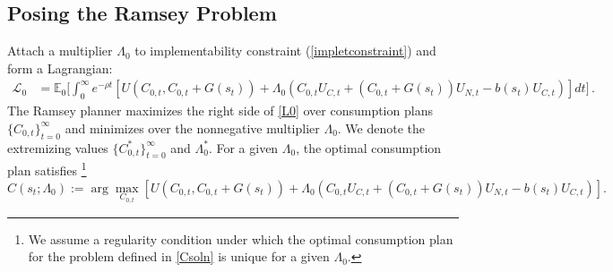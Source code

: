 \documentclass[12pt]{article}
\begin{document}
\subsection{Posing the Ramsey Problem} 
Attach a  multiplier  $\Lambda_0$  to implementability constraint  (\ref{impletconstraint}) and form  a Lagrangian: 
\begin{align}\label{L0}
	{\mathcal L}^{}_0 & = \mathbb{E}_0 \bigg[ \int_{0}^{\infty}  e^{-\rho t}\left[ U(C_{0, t}, C_{0, t}+G(s_t))+ \Lambda_0^{}\left( C_{0, t}U_{C, t}+(C_{0, t}+G(s_t))U_{N, t}-b(s_t)^{} U_{C, t}\right)  \right] dt \bigg] \, . %
\end{align} %
The Ramsey planner  maximizes the right side of  \eqref{L0} over consumption plans $\{C_{0,t}\}_{t=0}^\infty$   and minimizes over the nonnegative multiplier $\Lambda_0$.  We denote the extremizing values $\{C_{0,t}^*\}_{t=0}^\infty$ and $\Lambda_0^*$.
For a given $\Lambda_0$, the optimal consumption plan satisfies
\footnote{{We assume  a regularity condition under which 
	the optimal consumption plan for the problem defined in   \eqref{Csoln}   is unique for a  given $\Lambda_0$.}}
\begin{equation}\label{Csoln}
	C(s_t; \Lambda_0):=\arg\max_{C_{0, t}}  \left[ U(C_{0, t}, C_{0, t}+G(s_t))+ \Lambda_0\left( C_{0, t}U_{C, t}+(C_{0, t}+G(s_t))U_{N, t}-b(s_t) U_{C, t} \right) \right] .
\end{equation}
\end{document}
